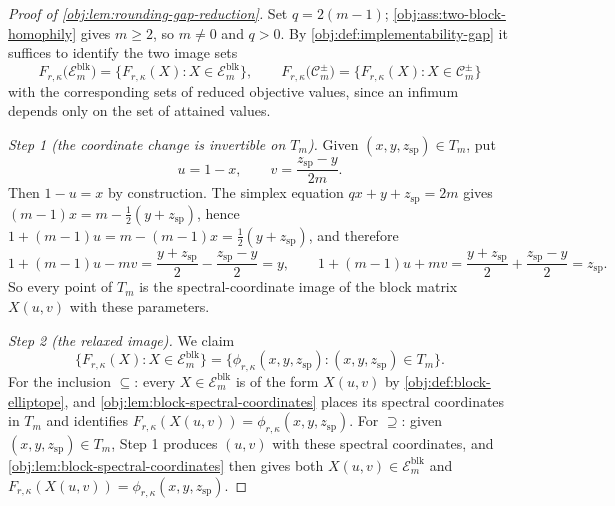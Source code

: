 \begin{proof}[Proof of \cref{obj:lem:rounding-gap-reduction}]
Set \(q=2(m-1)\); \cref{obj:ass:two-block-homophily} gives \(m\ge2\), so \(m\ne0\) and \(q>0\).  By \cref{obj:def:implementability-gap} it suffices to identify the two image sets
\[
F_{r,\kappa}\bigl(\mathcal E_m^{\mathrm{blk}}\bigr)
=\bigl\{F_{r,\kappa}(X):X\in\mathcal E_m^{\mathrm{blk}}\bigr\},
\qquad
F_{r,\kappa}\bigl(\mathcal C_m^{\pm}\bigr)
=\bigl\{F_{r,\kappa}(X):X\in\mathcal C_m^{\pm}\bigr\}
\]
with the corresponding sets of reduced objective values, since an infimum depends only on the set of attained values.

\emph{Step 1 (the coordinate change is invertible on \(T_m\)).}  Given \((x,y,z_{\mathrm{sp}})\in T_m\), put
\[
u=1-x,
\qquad
v=\frac{z_{\mathrm{sp}}-y}{2m}.
\]
Then \(1-u=x\) by construction.  The simplex equation \(qx+y+z_{\mathrm{sp}}=2m\) gives \((m-1)x=m-\tfrac{1}{2}(y+z_{\mathrm{sp}})\), hence \(1+(m-1)u=m-(m-1)x=\tfrac12(y+z_{\mathrm{sp}})\), and therefore
\[
1+(m-1)u-mv=\frac{y+z_{\mathrm{sp}}}{2}-\frac{z_{\mathrm{sp}}-y}{2}=y,
\qquad
1+(m-1)u+mv=\frac{y+z_{\mathrm{sp}}}{2}+\frac{z_{\mathrm{sp}}-y}{2}=z_{\mathrm{sp}} .
\]
So every point of \(T_m\) is the spectral-coordinate image of the block matrix \(X(u,v)\) with these parameters. %

\emph{Step 2 (the relaxed image).}  We claim
\[
\bigl\{F_{r,\kappa}(X):X\in\mathcal E_m^{\mathrm{blk}}\bigr\}
=\bigl\{\phi_{r,\kappa}(x,y,z_{\mathrm{sp}}):(x,y,z_{\mathrm{sp}})\in T_m\bigr\}.
\]
For the inclusion \(\subseteq\): every \(X\in\mathcal E_m^{\mathrm{blk}}\) is of the form \(X(u,v)\) by \cref{obj:def:block-elliptope}, and \cref{obj:lem:block-spectral-coordinates} places its spectral coordinates in \(T_m\) and identifies \(F_{r,\kappa}(X(u,v))=\phi_{r,\kappa}(x,y,z_{\mathrm{sp}})\).  For \(\supseteq\): given \((x,y,z_{\mathrm{sp}})\in T_m\), Step 1 produces \((u,v)\) with these spectral coordinates, and \cref{obj:lem:block-spectral-coordinates} then gives both \(X(u,v)\in\mathcal E_m^{\mathrm{blk}}\) and \(F_{r,\kappa}(X(u,v))=\phi_{r,\kappa}(x,y,z_{\mathrm{sp}})\). %


\end{proof}
